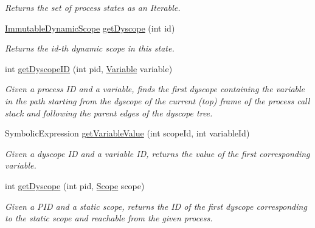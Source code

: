 \begin{DoxyCompactItemize}
\begin{DoxyCompactList}\small\item\em Returns the set of process states as an {\ttfamily Iterable}. \end{DoxyCompactList}\item 
\hyperlink{classedu_1_1udel_1_1cis_1_1vsl_1_1civl_1_1state_1_1common_1_1immutable_1_1ImmutableDynamicScope}{Immutable\+Dynamic\+Scope} \hyperlink{classedu_1_1udel_1_1cis_1_1vsl_1_1civl_1_1state_1_1common_1_1immutable_1_1ImmutableState_abc7d37b670066d127914ffe45196ded8}{get\+Dyscope} (int id)
\begin{DoxyCompactList}\small\item\em Returns the id-\/th dynamic scope in this state. \end{DoxyCompactList}\item 
int \hyperlink{classedu_1_1udel_1_1cis_1_1vsl_1_1civl_1_1state_1_1common_1_1immutable_1_1ImmutableState_a07a8d6d9d33a64572ed855bf1ef8d1e8}{get\+Dyscope\+I\+D} (int pid, \hyperlink{interfaceedu_1_1udel_1_1cis_1_1vsl_1_1civl_1_1model_1_1IF_1_1variable_1_1Variable}{Variable} variable)
\begin{DoxyCompactList}\small\item\em Given a process I\+D and a variable, finds the first dyscope containing the variable in the path starting from the dyscope of the current (top) frame of the process call stack and following the parent edges of the dyscope tree. \end{DoxyCompactList}\item 
Symbolic\+Expression \hyperlink{classedu_1_1udel_1_1cis_1_1vsl_1_1civl_1_1state_1_1common_1_1immutable_1_1ImmutableState_a1f635d02f7a18d855695f811dff9e4f3}{get\+Variable\+Value} (int scope\+Id, int variable\+Id)
\begin{DoxyCompactList}\small\item\em Given a dyscope I\+D and a variable I\+D, returns the value of the first corresponding variable. \end{DoxyCompactList}\item 
int \hyperlink{classedu_1_1udel_1_1cis_1_1vsl_1_1civl_1_1state_1_1common_1_1immutable_1_1ImmutableState_aec691aab7e280ab44a7a6430c753fac0}{get\+Dyscope} (int pid, \hyperlink{interfaceedu_1_1udel_1_1cis_1_1vsl_1_1civl_1_1model_1_1IF_1_1Scope}{Scope} scope)
\begin{DoxyCompactList}\small\item\em Given a P\+I\+D and a static scope, returns the I\+D of the first dyscope corresponding to the static scope and reachable from the given process. \end{DoxyCompactList}\item 

\end{DoxyCompactItemize}

